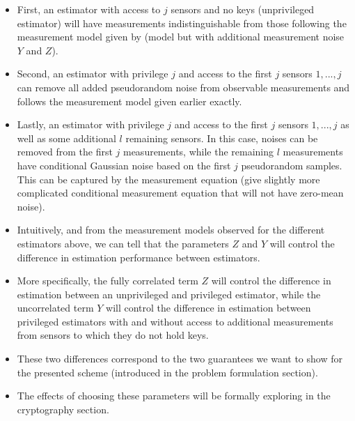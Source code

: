 \documentclass[conference]{IEEEtran}
\begin{document}
\begin{itemize}
  \item First, an estimator with access to $j$ sensors and no keys (unprivileged estimator) will have measurements indistinguishable from those following the measurement model given by (model but with additional measurement noise $Y$ and $Z$).
  \item Second, an estimator with privilege $j$ and access to the first $j$ sensors $1,...,j$ can remove all added pseudorandom noise from observable measurements and follows the measurement model given earlier exactly.
  \item Lastly, an estimator with privilege $j$ and access to the first $j$ sensors $1,...,j$ as well as some additional $l$ remaining sensors. In this case, noises can be removed from the first $j$ measurements, while the remaining $l$ measurements have conditional Gaussian noise based on the first $j$ pseudorandom samples. This can be captured by the measurement equation (give slightly more complicated conditional measurement equation that will not have zero-mean noise).
  \item Intuitively, and from the measurement models observed for the different estimators above, we can tell that the parameters $Z$ and $Y$ will control the difference in estimation performance between estimators.
  \item More specifically, the fully correlated term $Z$ will control the difference in estimation between an unprivileged and privileged estimator, while the uncorrelated term $Y$ will control the difference in estimation between privileged estimators with and without access to additional measurements from sensors to which they do not hold keys.
  \item These two differences correspond to the two guarantees we want to show for the presented scheme (introduced in the problem formulation section).
  \item The effects of choosing these parameters will be formally exploring in the cryptography section.
\end{itemize}
\end{document}
